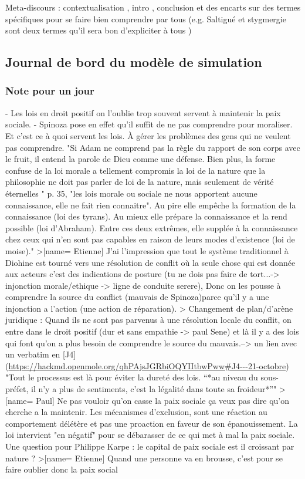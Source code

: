 Meta-discours : contextualisation , intro , conclusion et des encarts sur des termes spécifiques pour se faire bien comprendre par tous (e.g. Saltigué et stygmergie sont deux termes qu'il sera bon d'expliciter à tous )






\subsection{Journal de bord du modèle de simulation}


\subsubsection{Note pour un jour}
 - Les lois en droit positif on l'oublie trop souvent servent à maintenir la paix sociale.
 - Spinoza pose en effet qu'il suffit de ne pas comprendre pour moraliser. Et c'est ce à quoi servent les lois. À gérer les problèmes des gens qui ne veulent pas comprendre. "Si Adam ne comprend pas la règle du rapport de son corps avec le fruit, il entend la parole de Dieu comme une défense. Bien plus, la forme confuse de la loi morale a tellement compromis la loi de la nature que la philosophie ne doit pas parler de loi de la nature, mais seulement de vérité éternelles "  p. 35, "les lois morale ou sociale ne nous apportent aucune connaissance, elle ne fait rien connaitre". Au pire elle empêche la formation de la connaissance (loi des tyrans). Au mieux elle prépare la connaissance et la rend possible (loi d'Abraham). Entre ces deux extrêmes, elle supplée à la connaissance chez ceux qui n'en sont pas capables en raison de leurs modes d'existence (loi de moise)."
>[name= Etienne] J'ai l'impression que tout le système traditionnel à Diohine est tourné vers une résolution de conflit où la seule chose qui est donnée aux acteurs c'est des indications de posture (tu ne dois pas faire de tort...-> injonction morale/ethique -> ligne de conduite serere), Donc on les pousse à comprendre la source du conflict (mauvais de Spinoza)parce qu'il y a une injonction a l'action (une action de réparation). 
>
 Changement de plan/d'arène juridique : Quand ils ne sont pas parvenus à une résolution locale du conflit, on entre dans le droit positif (dur et sans empathie -> paul Sene) et là il y a des lois qui font qu'on a plus besoin de comprendre le source du mauvais.--> un lien avec un verbatim en [J4](\url{https://hackmd.openmole.org/qhPAjsJGRbiOQYIItbwPww#J4---21-octobre}) "Tout le processus est là pour éviter la dureté des lois. “*au niveau du sous-préfet, il n’y a plus de sentiments, c’est la légalité dans toute sa froideur*”"
>[name= Paul] Ne pas vouloir qu'on casse la paix sociale ça veux pas dire qu'on cherche a la maintenir. Les mécanismes d'exclusion, sont une réaction au comportement délétère et pas une proaction en faveur de son épanouissement. La loi intervient "en négatif" pour se débarasser de ce qui met à mal la paix sociale. Une question pour Philippe Karpe : le capital de paix sociale est il croissant par nature ? 
>[name= Etienne] Quand une personne va en brousse, c'est pour se faire oublier donc la paix social


